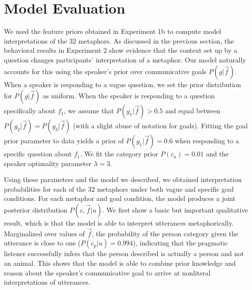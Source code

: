 \documentclass[10pt,letterpaper]{article}
\begin{document}
\section{Model Evaluation}
We used the feature priors obtained in Experiment 1b to compute model interpretations of the $32$ metaphors. As discussed in the previous section, the behavioral results in Experiment 2 show evidence that the context set up by a question changes participants' interpretation of a metaphor. Our model naturally accounts for this using the speaker's prior over communicative goals $P(g | \vec f)$. When a speaker is responding to a vague question, we set the prior distribution for $P(g | \vec f)$ as uniform. When the speaker is responding to a question specifically about $f_1$, we assume that $P(g_1 | \vec f) > 0.5$ and equal between $P(g_2 | \vec f) = P(g_3 | \vec f)$ (with a slight abuse of notation for goals). Fitting the goal prior parameter to data yields a prior of $P(g_1 | \vec f) = 0.6$ when responding to a specific question about $f_1$. We fit the category prior $P(c_a) = 0.01$ and the speaker optimality parameter $\lambda = 3$. %

Using these parameters and the model we described, we obtained interpretation probabilities for each of the $32$ metaphors under both vague and specific goal conditions. For each metaphor and goal condition, the model produces a joint posterior distribution $P(c, \vec f | u)$. We first show a basic but important qualitative result, which is that the model is able to interpret utterances metaphorically. Marginalized over values of $\vec f$, the probability of the person category given the utterance is close to one ($P(c_p | u) = 0.994$), indicating that the pragmatic listener successfully infers that the person described is actually a person and not an animal. This shows that the model is able to combine prior knowledge and reason about the speaker's communicative goal to arrive at nonliteral interpretations of utterances.

\end{document}

